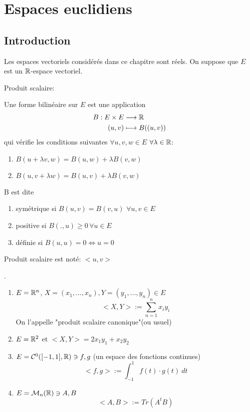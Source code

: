 
\chapter{Espaces euclidiens}
\section{Introduction}
Les espaces vectoriels considérés dans ce chapitre sont réels. On suppose que $E$ est un $\mathbb{R}$-espace vectoriel.

Produit scalaire:
\begin{definition}
    Une forme bilinéaire sur $E$ est une application  
    \begin{align*}
        B: E \times E &\longrightarrow \mathbb{R} \\
        (u, v) &\longmapsto B((u, v))
    \end{align*}
    qui vérifie les conditions suivantes $\forall u, v, w \in E$ $\forall \lambda \in \mathbb{R}$:
    \begin{enumerate}
        \item $B(u + \lambda v, w) = B(u, w) + \lambda B(v, w)$
        \item  $B(u, v + \lambda w) = B(u, v) + \lambda B(v, w)$
    \end{enumerate}
    B est dite 
    \begin{enumerate}
        \item symétrique si $B(u, v) = B(v, u)$  $\forall u, v \in E$
        \item positive si $B(., u) \ge 0 \, \forall u \in E$
        \item définie si $B(u, u) = 0 \iff u = 0$
    \end{enumerate}
\end{definition}
\begin{notation}
   Produit scalaire est noté: $<u, v>$ 
\end{notation}
\begin{eg}.
   \begin{enumerate}
       \item $E = \mathbb{R}^n$,  $X = (x_1, \ldots, x_n), Y = (y_1, \ldots, y_n) \in E$\\
           \[
               <X, Y> := \sum_{n=1}^{n} x_iy_i
           \] 
           On l'appelle "produit scalaire canonique"(ou usuel)
        \item $E = \mathbb{R}^2$ et  $<X, Y> = 2x_1y_1 + x_2y_2$
        \item $E = \mathcal{C}^0([-1, 1], \mathbb{R}) \ni f, g$ (un espace des fonctions continues)
            \[
                <f, g> := \int_{-1}^{1} f(t) \cdot g(t) \: d{t} 
            \] 
        \item $E = \mathcal{M}_n(\mathbb{R}) \ni A, B$
             \[
            <A, B> := Tr(A^tB)
            \] 
   \end{enumerate} 
\end{eg}

